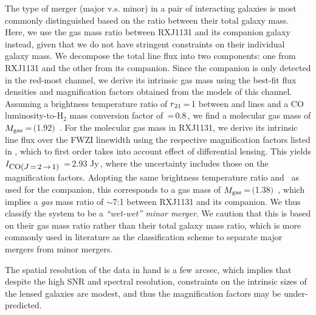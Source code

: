 \documentclass[]{emulateapj}
\begin{document}
The type of merger (major v.s. minor) in a pair of interacting galaxies 
is most commonly distinguished based on 
the ratio between their total galaxy mass.
Here, we use the gas mass ratio between RXJ1131 and
its companion galaxy instead, given that we do not have stringent constraints on their individual galaxy mass.
We decompose the total line flux into two components:
one from RXJ1131 and the other from its companion.
Since the companion is only detected in the red-most channel, we
derive its intrinsic gas mass using the best-fit flux 
densities and magnification factors obtained from the models of this channel.
Assuming a brightness temperature ratio 
of $r_{\rm 21}$\,=\,1 between \bco and \aco lines and
a CO luminosity-to-H$_2$ mass conversion factor of
\alphaco\,=\,0.8\,\alphaU, we find
a molecular gas mass of $M_{\rm gas}$\,=\,$($1.92$)$\, \Msun.
For the molecular gas mass in RXJ1131, we derive
its intrinsic line flux over the FWZI linewidth
using the respective magnification
factors listed in , which to
first order takes into account effect of differential lensing.
This yields $I_{\small \mbox{CO($J$\,=\,2\,$\rightarrow$\,1) }}$\,=\,2.93 Jy\,\kms,
where the uncertainty includes those on
the magnification factors.
Adopting the same brightness temperature ratio and \alphaco\ as
used for the companion, this corresponds to a gas mass of
$M_{\rm gas}$\,=\,$($1.38$)$\, \Msun, which
implies a {\em gas} mass ratio of $\sim$7:1 between RXJ1131 and its companion.
We thus classify the system to be a {\em ``wet-wet'' minor merger}.
We caution that this is based on their gas mass ratio rather than their total galaxy mass ratio, which 
is more commonly used in literature as the
classification scheme to separate major mergers from minor mergers. 

The spatial resolution of the data in hand
is a few arcsec, which implies that despite the high SNR and spectral
resolution, constraints on the intrinsic sizes of the lensed galaxies are modest, and thus the magnification
factors may be under-predicted. %
\end{document}
